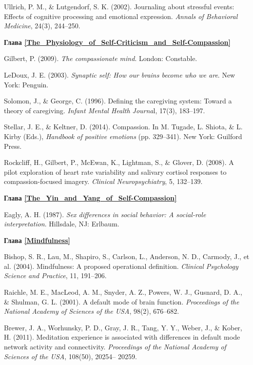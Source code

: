 \begin{thebibliography}{999}
	 Ullrich, P. M., \& Lutgendorf, S. K. (2002). Journaling about stressful events: Effects of cognitive processing and emotional expression. \textit{Annals of Behavioral Medicine}, 24(3), 244–250.
	
	
	\vspace{3ex}
	\textbf{Глава \ref{The_Physiology_of_Self-Criticism_and_Self-Compassion}}
	
	 Gilbert, P. (2009). \textit{The compassionate mind}. London: Constable.
	
	 LeDoux, J. E. (2003). \textit{Synaptic self: How our brains become who we are}. New York: Penguin.
		
	 Solomon, J., \& George, C. (1996). Defining the caregiving system: Toward a theory of caregiving. \textit{Infant Mental Health Journa}l, 17(3), 183–197.
	
	 Stellar, J. E., \& Keltner, D. (2014). Compassion. In M. Tugade, L. Shiota, \& L. Kirby (Eds.), \textit{Handbook of positive emotions} (pp. 329–341). New York: Guilford Press.
	
	 Rockcliff, H., Gilbert, P., McEwan, K., Lightman, S., \& Glover, D. (2008). A pilot exploration of heart rate variability and salivary cortisol responses to compassion-focused imagery. \textit{Clinical Neuropsychiatry}, 5, 132–139.


 	\vspace{3ex}
 	\textbf{Глава \ref{The_Yin_and_Yang_of_Self-Compassion}}

	 Eagly, A. H. (1987). \textit{Sex differences in social behavior: A social-role interpretation}. Hillsdale, NJ: Erlbaum.
	
	
	\vspace{3ex}
	\textbf{Глава \ref{Mindfulness}}
	
	 Bishop, S. R., Lau, M., Shapiro, S., Carlson, L., Anderson, N. D., Carmody, J., et al. (2004). Mindfulness: A proposed operational definition. \textit{Clinical Psychology Science and Practice}, 11, 191–206.
	
	 Raichle, M. E., MacLeod, A. M., Snyder, A. Z., Powers, W. J., Gusnard, D. A., \& Shulman, G. L. (2001). A default mode of brain function. \textit{Proceedings of the National Academy of Sciences of the USA}, 98(2), 676–682.
	
	 Brewer, J. A., Worhunsky, P. D., Gray, J. R., Tang, Y. Y., Weber, J., \& Kober, H. (2011). Meditation experience is associated with differences in default mode network activity and connectivity. \textit{Proceedings of the National Academy of Sciences of the USA}, 108(50), 20254– 20259.
	

\end{thebibliography}
